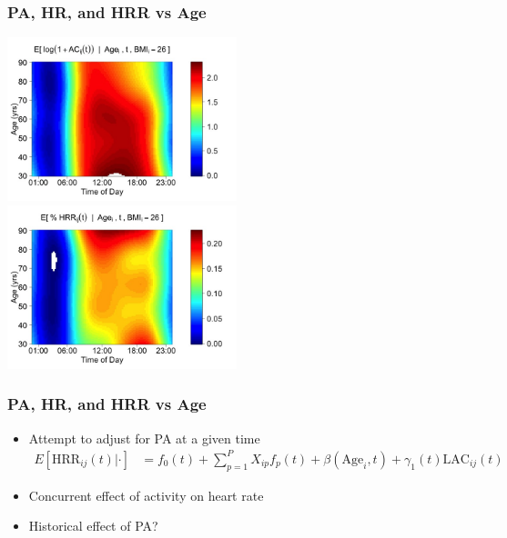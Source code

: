 \documentclass[10pt]{beamer}\usepackage[]{graphicx}\usepackage[]{color}
\begin{document}
\begin{frame}
\frametitle{PA, HR, and HRR vs Age}
\begin{center}
\includegraphics[width=0.5\textwidth]{coef_AC_mar.jpeg}
\includegraphics[width=0.5\textwidth]{coef_HRR_mar.jpeg}
\end{center}
\end{frame}



\begin{frame}
\frametitle{PA, HR, and HRR vs Age}
\begin{itemize}
\item Attempt to adjust for PA at a given time
\begin{align*}
E[\text{HRR}_{ij}(t)|\cdot] &= f_0(t) + \sum_{p=1}^P X_{ip}f_p(t) + \beta(\text{Age}_i,t) + \gamma_1(t)\text{LAC}_{ij}(t)
\end{align*}
\item Concurrent effect of activity on heart rate
\item Historical effect of PA?
\end{itemize}
\end{frame}
\end{document}
